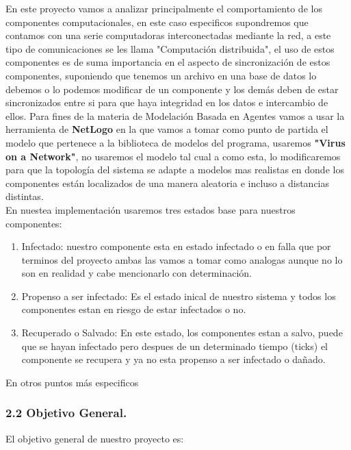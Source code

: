 \documentclass[12pt]{article}
\begin{document}
En este proyecto vamos a analizar principalmente el comportamiento de los componentes computacionales, en este caso especificos supondremos que contamos con una serie computadoras interconectadas mediante la red, a este tipo de comunicaciones se les llama "Computación distribuida", el uso de estos componentes es de suma importancia en el aspecto de 
sincronización de estos componentes, suponiendo que tenemos un archivo en una base de datos lo debemos o lo podemos modificar de un componente y los demás deben de estar sincronizados entre si para que haya integridad en los datos e intercambio de ellos.
Para fines de la materia de Modelación Basada en Agentes vamos a usar la herramienta de \textbf{NetLogo} en la que vamos a tomar como punto de partida el modelo que pertenece a la biblioteca de modelos del programa, usaremos \textbf{"Virus on a
Network"}, no usaremos el modelo tal cual a como esta, lo modificaremos para que la topología del sistema se adapte a modelos mas realistas en donde los componentes están localizados de una manera aleatoria e incluso a distancias distintas.\\
En nuestea implementación usaremos tres estados base para nuestros componentes:\\
\begin{enumerate}
    \item Infectado: nuestro componente esta en estado infectado o en falla que por terminos del proyecto ambas las vamos a tomar como analogas aunque no lo son en realidad y cabe mencionarlo con determinación.
    \item Propenso a ser infectado: Es el estado inical de nuestro sistema y todos los componentes estan en riesgo de estar infectados o no.
    \item Recuperado o Salvado: En este estado, los componentes estan a salvo, puede que se hayan infectado pero despues de un determinado tiempo (ticks) el componente se recupera y ya no esta propenso a ser infectado o dañado. 
\end{enumerate}

En otros puntos más especificos 


{\color{red} \subsubsection*{2.2 Objetivo General.}}
\vspace{1em}

El objetivo general de nuestro proyecto es:\\
\end{document}
